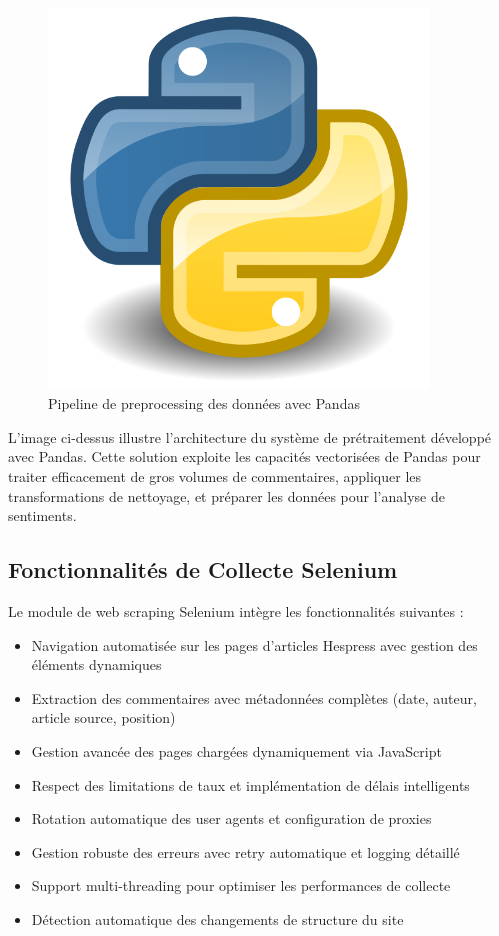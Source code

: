 \begin{figure}[H]
\centering
\includegraphics[width=0.9\textwidth]{assets/images/python.png}
\caption{Pipeline de preprocessing des données avec Pandas}
\label{fig:pandas-preprocessing}
\end{figure}

L'image ci-dessus illustre l'architecture du système de prétraitement développé avec Pandas. Cette solution exploite les capacités vectorisées de Pandas pour traiter efficacement de gros volumes de commentaires, appliquer les transformations de nettoyage, et préparer les données pour l'analyse de sentiments.

\subsection{Fonctionnalités de Collecte Selenium}

Le module de web scraping Selenium intègre les fonctionnalités suivantes :
\begin{itemize}
    \item Navigation automatisée sur les pages d'articles Hespress avec gestion des éléments dynamiques
    \item Extraction des commentaires avec métadonnées complètes (date, auteur, article source, position)
    \item Gestion avancée des pages chargées dynamiquement via JavaScript
    \item Respect des limitations de taux et implémentation de délais intelligents
    \item Rotation automatique des user agents et configuration de proxies
    \item Gestion robuste des erreurs avec retry automatique et logging détaillé
    \item Support multi-threading pour optimiser les performances de collecte
    \item Détection automatique des changements de structure du site
\end{itemize}

